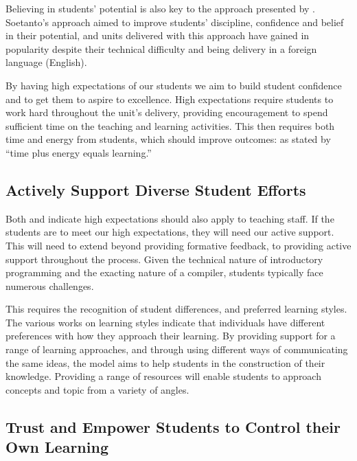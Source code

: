 Believing in students' potential is also key to the approach presented by \citet{Soetanto:2003,Soetanto:2012}. Soetanto's approach aimed to improve students' discipline, confidence and belief in their potential, and units delivered with this approach have gained in popularity despite their technical difficulty and being delivery in a foreign language (English). 

By having high expectations of our students we aim to build student confidence and to get them to aspire to excellence. High expectations require students to work hard throughout the unit's delivery, providing encouragement to spend sufficient time on the teaching and learning activities. This then requires both time and energy from students, which should improve outcomes: as stated by \citet{Chickering:1987} ``time plus energy equals learning.''


\subsection{Actively Support Diverse Student Efforts} %
\label{ssub:actively_support_student_efforts}

Both \citet{Chickering:1987} and \citet{Soetanto:2003,Soetanto:2012} indicate high expectations should also apply to teaching staff. If the students are to meet our high expectations, they will need our active support. This will need to extend beyond providing formative feedback, to providing active support throughout the process. Given the technical nature of introductory programming and the exacting nature of a compiler, students typically face numerous challenges.

This requires the recognition of student differences, and preferred learning styles. The various works on learning styles \cite{Coffield:2004} indicate that individuals have different preferences with how they approach their learning. By providing support for a range of learning approaches, and through using different ways of communicating the same ideas, the model aims to help students in the construction of their knowledge. Providing a range of resources will enable students to approach concepts and topic from a variety of angles.


\subsection{Trust and Empower Students to Control their Own Learning} %
\label{ssub:trust_and_empower_students_to_control_their_own_learning}

